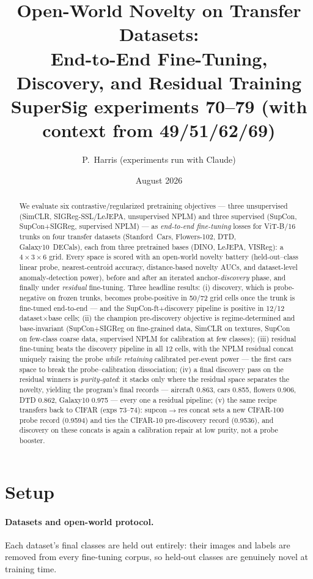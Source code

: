 \documentclass[11pt]{article}
\title{Open-World Novelty on Transfer Datasets:\\
End-to-End Fine-Tuning, Discovery, and Residual Training\\
{\large SuperSig experiments 70--79 (with context from 49/51/62/69)}}
\author{P.~Harris (experiments run with Claude)}
\date{August 2026}
\begin{document}
\maketitle

\begin{abstract}
We evaluate six contrastive/regularized pretraining objectives --- three
unsupervised (SimCLR, SIGReg-SSL/LeJEPA, unsupervised NPLM) and three
supervised (SupCon, SupCon+SIGReg, supervised NPLM) --- as \emph{end-to-end
fine-tuning} losses for ViT-B/16 trunks on four transfer datasets
(Stanford~Cars, Flowers-102, DTD, Galaxy10~DECals), each from three
pretrained bases (DINO, LeJEPA, VISReg): a $4\times3\times6$ grid.  Every
space is scored with an open-world novelty battery (held-out--class linear
probe, nearest-centroid accuracy, distance-based novelty AUCs, and
dataset-level anomaly-detection power), before and after an iterated
anchor-\emph{discovery} phase, and finally under \emph{residual}
fine-tuning.  Three headline results: (i) discovery, which is
probe-negative on frozen trunks, becomes probe-positive in 50/72 grid
cells once the trunk is fine-tuned end-to-end --- and the
SupCon-ft$+$discovery pipeline is positive in 12/12 dataset$\times$base
cells; (ii) the champion pre-discovery objective is regime-determined and
base-invariant (SupCon+SIGReg on fine-grained data, SimCLR on textures,
SupCon on few-class coarse data, supervised NPLM for calibration at few
classes); (iii) residual fine-tuning beats the discovery pipeline in all
12 cells, with the NPLM residual concat uniquely raising the probe
\emph{while retaining} calibrated per-event power --- the first cars
space to break the probe--calibration dissociation; (iv) a final
discovery pass on the residual winners is \emph{purity-gated}: it stacks
only where the residual space separates the novelty, yielding the
program's final records --- aircraft 0.863, cars 0.855, flowers 0.906,
DTD 0.862, Galaxy10 0.975 --- every one a residual pipeline; (v) the
same recipe transfers back to CIFAR (exps 73--74): supcon$\to$res concat
sets a new CIFAR-100 probe record (0.9594) and ties the CIFAR-10
pre-discovery record (0.9536), and discovery on these concats is again
a calibration repair at low purity, not a probe booster.
\end{abstract}

\section{Setup}

\paragraph{Datasets and open-world protocol.}
Each dataset's final classes are held out entirely: their images and
labels are removed from every fine-tuning corpus, so held-out classes are
genuinely novel at training time.
\end{document}
